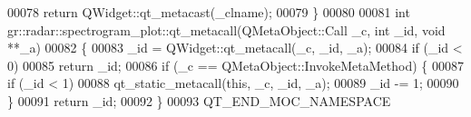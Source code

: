 \begin{DoxyCode}
00078     \textcolor{keywordflow}{return} QWidget::qt\_metacast(\_clname);
00079 \}
00080 
00081 \textcolor{keywordtype}{int} gr::radar::spectrogram\_plot::qt\_metacall(QMetaObject::Call \_c, \textcolor{keywordtype}{int} \_id, \textcolor{keywordtype}{void} **\_a)
00082 \{
00083     \_id = QWidget::qt\_metacall(\_c, \_id, \_a);
00084     \textcolor{keywordflow}{if} (\_id < 0)
00085         \textcolor{keywordflow}{return} \_id;
00086     \textcolor{keywordflow}{if} (\_c == QMetaObject::InvokeMetaMethod) \{
00087         \textcolor{keywordflow}{if} (\_id < 1)
00088             qt\_static\_metacall(\textcolor{keyword}{this}, \_c, \_id, \_a);
00089         \_id -= 1;
00090     \}
00091     \textcolor{keywordflow}{return} \_id;
00092 \}
00093 QT\_END\_MOC\_NAMESPACE
\end{DoxyCode}
